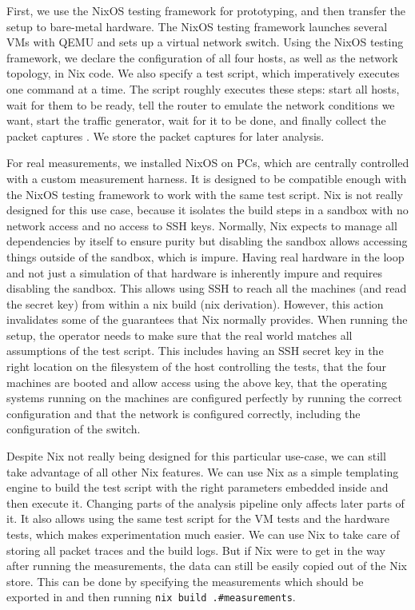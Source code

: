 First, we use the NixOS testing framework for prototyping, and then transfer the setup to bare-metal hardware.
The NixOS testing framework launches several VMs with QEMU and sets up a virtual network switch.
Using the NixOS testing framework, we declare the configuration of all four hosts, as well as the network topology, in Nix code.
We also specify a test script, which imperatively executes one command at a time.
The script roughly executes these steps: start all hosts, wait for them to be ready, tell the router to emulate the network conditions we want, start the traffic generator, wait for it to be done, and finally collect the packet captures .
We store the packet captures for later analysis.

For real measurements, we installed NixOS on PCs, which are centrally controlled with a custom measurement harness.
It is designed to be compatible enough with the NixOS testing framework to work with the same test script.
Nix is not really designed for this use case, because it isolates the build steps in a sandbox with no network access and no access to SSH keys.
Normally, Nix expects to manage all dependencies by itself to ensure purity but disabling the sandbox allows accessing things outside of the sandbox, which is impure.
Having real hardware in the loop and not just a simulation of that hardware is inherently impure and requires disabling the sandbox.
This allows using SSH to reach all the machines (and read the secret key) from within a nix build (nix derivation).
However, this action invalidates some of the guarantees that Nix normally provides.
When running the setup, the operator needs to make sure that the real world matches all assumptions of the test script.
This includes having an SSH secret key in the right location on the filesystem of the host controlling the tests, that the four machines are booted and allow access using the above key, that the operating systems running on the machines are configured perfectly by running the correct configuration and that the network is configured correctly, including the configuration of the switch.

Despite Nix not really being designed for this particular use-case, we can still take advantage of all other Nix features.
We can use Nix as a simple templating engine to build the test script with the right parameters embedded inside and then execute it.
Changing parts of the analysis pipeline only affects later parts of it. 
It also allows using the same test script for the VM tests and the hardware tests, which makes experimentation much easier.
We can use Nix to take care of storing all packet traces and the build logs.
But if Nix were to get in the way after running the measurements, the data can still be easily copied out of the Nix store.
This can be done by specifying the measurements which should be exported in  and then running \texttt{nix build .#measurements}.

